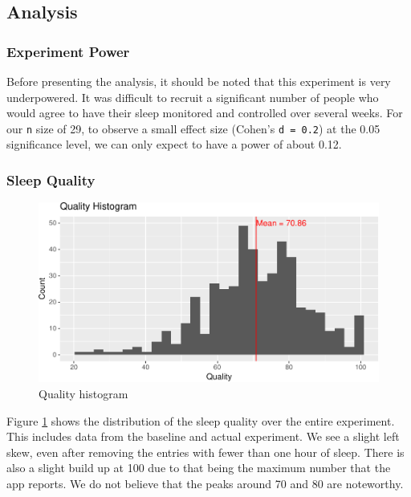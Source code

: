 \documentclass[12pt,]{article}
\begin{document}
\subsection{Analysis}\label{analysis}

\subsubsection{Experiment Power}\label{experiment-power}

Before presenting the analysis, it should be noted that this experiment
is very underpowered. It was difficult to recruit a significant number
of people who would agree to have their sleep monitored and controlled
over several weeks. For our \texttt{n} size of 29, to observe a small
effect size (Cohen's \texttt{d\ =\ 0.2}) at the 0.05 significance level,
we can only expect to have a power of about 0.12.

\subsubsection{Sleep Quality}\label{sleep-quality}

\begin{figure}
\centering
\includegraphics{report_files/figure-latex/quality_histogram-1.pdf}
\caption{\label{fig:quality_histogram} Quality histogram}
\end{figure}

Figure \ref{fig:quality_histogram} shows the distribution of the sleep
quality over the entire experiment. This includes data from the baseline
and actual experiment. We see a slight left skew, even after removing
the entries with fewer than one hour of sleep. There is also a slight
build up at 100 due to that being the maximum number that the app
reports. We do not believe that the peaks around 70 and 80 are
noteworthy.
\end{document}
